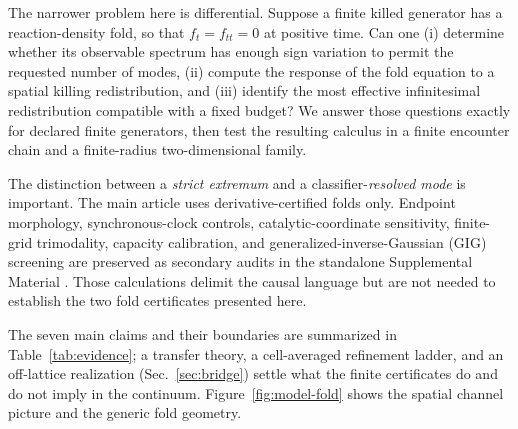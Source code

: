 \documentclass[aps,pre,reprint,amsmath,amssymb,longbibliography,floatfix]{revtex4-2}
\begin{document}
The narrower problem here is differential. Suppose a finite killed generator
has a reaction-density fold, so that
\(f_t=f_{tt}=0\) at positive time. Can one (i) determine whether its observable
spectrum has enough sign variation to permit the requested number of modes,
(ii) compute the response of the fold equation to a spatial killing
redistribution, and (iii) identify the most effective infinitesimal
redistribution compatible with a fixed budget? We answer those questions
exactly for declared finite generators, then test the resulting calculus in a
finite encounter chain and a finite-radius two-dimensional family.

The distinction between a \emph{strict extremum} and a
classifier-\emph{resolved mode} is important. The main article uses
derivative-certified folds only. Endpoint morphology, synchronous-clock
controls, catalytic-coordinate sensitivity, finite-grid trimodality,
capacity calibration, and generalized-inverse-Gaussian (GIG) screening are
preserved as secondary audits in the standalone Supplemental Material
\cite{supplementalMaterial}. Those calculations delimit the causal language
but are not needed to establish the two fold certificates presented here.

The seven main claims and their boundaries are summarized in
Table~\ref{tab:evidence}; a transfer theory, a cell-averaged refinement
ladder, and an off-lattice realization (Sec.~\ref{sec:bridge}) settle what
the finite certificates do and do not imply in the continuum. Figure~\ref{fig:model-fold} shows the spatial
channel picture and the generic fold geometry.
\end{document}
